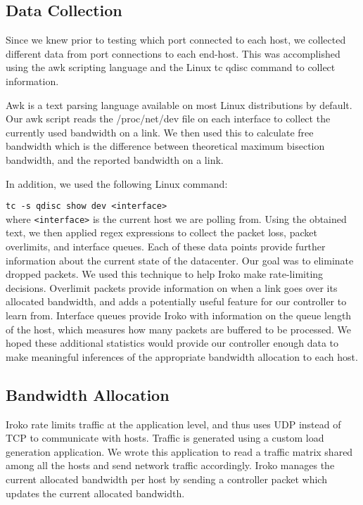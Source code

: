 \subsection{Data Collection }
Since we knew prior to testing which port connected to each host,
we collected different data from port connections to each end-host. 
This was accomplished using the awk scripting language and the Linux tc qdisc command to collect information.

Awk is a text parsing language available on most Linux distributions by default.
Our awk script reads the /proc/net/dev file on each interface to collect the currently
used  bandwidth on a link. We then used this to calculate free bandwidth which is the difference
between theoretical maximum bisection bandwidth, and the reported bandwidth on a link.

In addition, we used the following Linux command:\\
\vspace{1mm}

\texttt{tc -s qdisc show dev <interface>}\\

\vspace{1mm}
where \texttt{<interface>} is the current host we are polling from. Using the 
obtained text, we then applied regex expressions to collect the packet loss, 
packet overlimits, and interface queues. Each of these data points provide further 
information about the current state of the datacenter. Our goal was to 
eliminate dropped packets. We used this technique to help Iroko make rate-limiting 
decisions. Overlimit packets provide information on when a link goes over its 
allocated bandwidth, and adds a potentially useful feature for our controller 
to learn from. Interface queues provide Iroko with information on the queue 
length of the host, which measures how many packets are buffered to be 
processed.  We hoped these additional statistics would provide our controller 
enough data to make meaningful inferences of the appropriate bandwidth 
allocation to each host. 

\subsection{Bandwidth Allocation}
Iroko rate limits traffic at the application level, and thus uses UDP instead
of TCP to communicate with hosts. Traffic is generated using a custom load generation
application. We wrote this application to read a traffic matrix shared among all the hosts and send network traffic accordingly.
Iroko manages the current allocated bandwidth per host by sending a controller packet
which updates the current allocated bandwidth.


